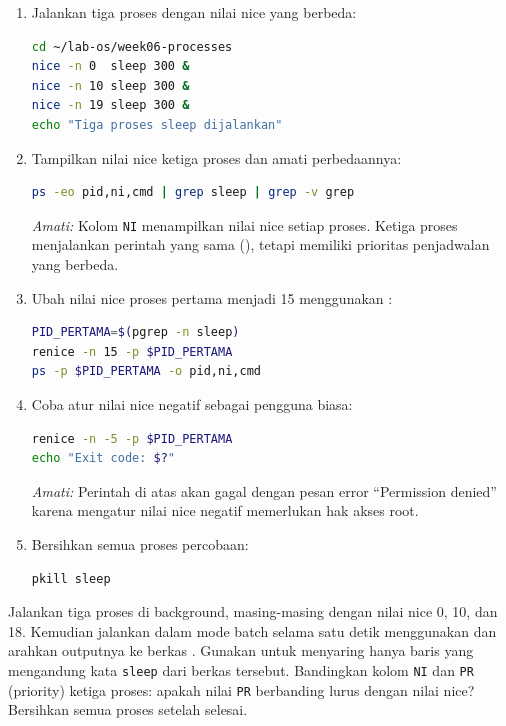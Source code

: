 \begin{enumerate}
    \item Jalankan tiga proses dengan nilai nice yang berbeda:
\begin{lstlisting}[language=bash, caption={Menjalankan proses dengan nice berbeda}]
cd ~/lab-os/week06-processes
nice -n 0  sleep 300 &
nice -n 10 sleep 300 &
nice -n 19 sleep 300 &
echo "Tiga proses sleep dijalankan"
\end{lstlisting}

    \item Tampilkan nilai nice ketiga proses dan amati perbedaannya:
\begin{lstlisting}[language=bash, caption={Melihat nilai nice setiap proses}]
ps -eo pid,ni,cmd | grep sleep | grep -v grep
\end{lstlisting}
    \textit{Amati:} Kolom \texttt{NI} menampilkan nilai nice setiap proses. Ketiga proses menjalankan perintah yang sama (), tetapi memiliki prioritas penjadwalan yang berbeda.

    \item Ubah nilai nice proses pertama menjadi 15 menggunakan :
\begin{lstlisting}[language=bash, caption={Mengubah nice proses yang sedang berjalan}]
PID_PERTAMA=$(pgrep -n sleep)
renice -n 15 -p $PID_PERTAMA
ps -p $PID_PERTAMA -o pid,ni,cmd
\end{lstlisting}

    \item Coba atur nilai nice negatif sebagai pengguna biasa:
\begin{lstlisting}[language=bash, caption={Mencoba nice negatif tanpa root}]
renice -n -5 -p $PID_PERTAMA
echo "Exit code: $?"
\end{lstlisting}
    \textit{Amati:} Perintah di atas akan gagal dengan pesan error ``Permission denied'' karena mengatur nilai nice negatif memerlukan hak akses root.

    \item Bersihkan semua proses percobaan:
\begin{lstlisting}[language=bash, caption={Membersihkan proses percobaan}]
pkill sleep
\end{lstlisting}
\end{enumerate}

\begin{challengebox}
Jalankan tiga proses  di background, masing-masing dengan nilai nice 0,
10, dan 18. Kemudian jalankan  dalam mode batch selama satu detik menggunakan
 dan arahkan outputnya ke berkas . Gunakan 
untuk menyaring hanya baris yang mengandung kata \texttt{sleep} dari berkas tersebut.
Bandingkan kolom \texttt{NI} dan \texttt{PR} (priority) ketiga proses: apakah nilai
\texttt{PR} berbanding lurus dengan nilai nice? Bersihkan semua proses setelah selesai.
\end{challengebox}

